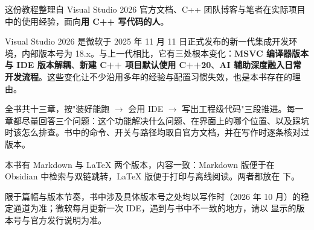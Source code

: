 这份教程整理自 Visual Studio 2026 官方文档、C++ 团队博客与笔者在实际项目中的使用经验，面向\textbf{用 C++ 写代码的人}。

Visual Studio 2026 是微软于 2025 年 11 月 11 日正式发布的新一代集成开发环境，内部版本号为 18.x。与上一代相比，它有三处根本变化：\textbf{MSVC 编译器版本与 IDE 版本解耦}、\textbf{新建 C++ 项目默认使用 C++20}、\textbf{AI 辅助深度融入日常开发流程}。这些变化让不少沿用多年的经验与配置习惯失效，也是本书存在的理由。

全书共十三章，按"装好能跑 $\rightarrow$ 会用 IDE $\rightarrow$ 写出工程级代码"三段推进。每一章都尽量回答三个问题：这个功能解决什么问题、在界面上的哪个位置、以及踩坑时该怎么排查。书中的命令、开关与路径均取自官方文档，并在写作时逐条核对过版本。

本书有 Markdown 与 LaTeX 两个版本，内容一致：Markdown 版便于在 Obsidian 中检索与双链跳转，LaTeX 版便于打印与离线阅读。两者都放在  下。

限于篇幅与版本节奏，书中涉及具体版本号之处均以写作时（2026 年 10 月）的稳定通道为准；微软每月更新一次 IDE，遇到与书中不一致的地方，请以  显示的版本号与官方发行说明为准。
